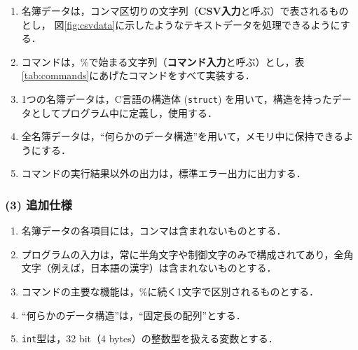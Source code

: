 \begin{enumerate}
  \setlength{\parskip}{0em} \setlength{\itemsep}{0.25em}  %
    \item 名簿データは，コンマ区切りの文字列（\textbf{CSV入力}と呼ぶ）で表されるものとし，
          図\ref{fig:csvdata}に示したようなテキストデータを処理できるようにする．%
    \item コマンドは，\%で始まる文字列（\textbf{コマンド入力}と呼ぶ）とし，表\ref{tab:commands}にあげたコマンドをすべて実装する．
    \item 1つの名簿データは，C言語の構造体 (\texttt{struct}) を用いて，構造を持ったデータとしてプログラム中に定義し，使用する．
    \item 全名簿データは，“何らかのデータ構造”を用いて，メモリ中に保持できるようにする．
    \item コマンドの実行結果以外の出力は，標準エラー出力に出力する．
\end{enumerate}

\subsubsection*{(3) 追加仕様}

\begin{enumerate}
    \item 名簿データの各項目には，コンマは含まれないものとする．
    \item プログラムの入力は，常に半角文字や制御文字のみで構成されてあり，全角文字（例えば，日本語の漢字）は含まれないものとする．
    \item コマンドの主要な機能は，\%に続く1文字で区別されるものとする．
    \item “何らかのデータ構造”は，“固定長の配列”とする．
    \item \verb|int|型は，32 bit（4 bytes）の整数型を扱える変数とする．
\end{enumerate}


